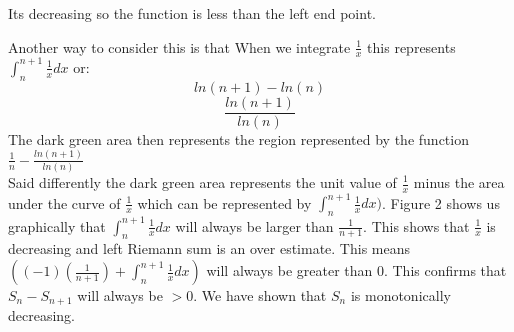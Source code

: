 \documentclass{article}
\begin{document}
Its decreasing so the function is less than the left end point.

Another way to consider this is that When we integrate $\frac{1}{x}$ this represents $\int_{n}^{n+1} \frac{1}{x}dx$ or:
$$ln(n+1)-ln(n)$$
$$\frac{ln(n+1)}{ln(n)}$$
The dark green area then represents the region represented by the function $\frac{1}{n} - \frac{ln(n+1)}{ln(n)} $  
\\Said differently the dark green area represents the unit value of $\frac{1}{x}$ minus the area under the curve of $\frac{1}{x}$ which can be represented by $\int_{n}^{n+1} \frac{1}{x}dx)$.
Figure 2 shows us graphically that $\int_n^{n+1} \frac{1}{x}dx$ will always be larger than $\frac{1}{n+1}$. This shows that $\frac{1}{x}$ is decreasing and left Riemann sum is an over estimate. This means $((-1)(\frac{1}{n+1})+\int_{n}^{n+1} \frac{1}{x}dx)$ will always be greater than $0$.
This confirms that $S_n-S_{n+1}$ will always be $>0$. We have shown that $S_n$ is monotonically decreasing.\\
\end{document}
